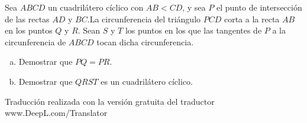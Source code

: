 Sea $ABCD$ un cuadrilátero cíclico con $AB<CD$, y sea $P$ el punto de intersección de las rectas $AD$ y $BC$.La circunferencia del triángulo $PCD$ corta a la recta $AB$ en los puntos $Q$ y $R$. Sean $S$ y $T$ los puntos en los que las tangentes de $P$ a la circunferencia de $ABCD$ tocan dicha circunferencia.
\begin{enumerate}[(a)]
  \item Demostrar que $PQ=PR$.
  \item Demostrar que $QRST$ es un cuadrilátero cíclico.
\end{enumerate}

Traducción realizada con la versión gratuita del traductor www.DeepL.com/Translator
